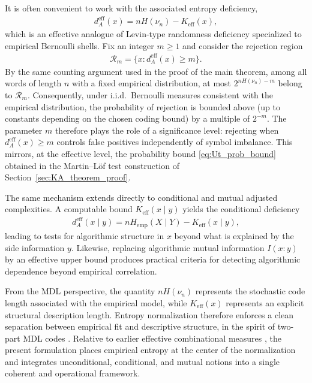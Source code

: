 \documentclass[12pt]{article}
\begin{document}
It is often convenient to work with the associated entropy deficiency,
\begin{eqnarray}
d_A^{\mathrm{eff}}(x)
=
nH(\nu_n)-K_{\mathrm{eff}}(x),
\label{eq:eff_deficiency_clean}
\end{eqnarray}
which is an effective analogue of Levin-type randomness deficiency specialized
to empirical Bernoulli shells. Fix an integer $m\ge1$ and consider the rejection
region
\begin{eqnarray}
\mathcal{R}_m
=
\{x:d_A^{\mathrm{eff}}(x)\ge m\}.
\label{eq:reject_region_clean}
\end{eqnarray}
By the same counting argument used in the proof of the main theorem, among all
words of length $n$ with a fixed empirical distribution, at most
$2^{nH(\nu_n)-m}$ belong to $\mathcal{R}_m$. Consequently, under i.i.d.\
Bernoulli measures consistent with the empirical distribution, the probability
of rejection is bounded above (up to constants depending on the chosen coding
bound) by a multiple of $2^{-m}$. The parameter $m$ therefore plays the role of a
significance level: rejecting when $d_A^{\mathrm{eff}}(x)\ge m$ controls false
positives independently of symbol imbalance. This mirrors, at the effective
level, the probability bound \eqref{eq:Ut_prob_bound} obtained in the
Martin--L\"of test construction of Section~\ref{sec:KA_theorem_proof}.

The same mechanism extends directly to conditional and mutual adjusted
complexities. A computable bound $K_{\mathrm{eff}}(x\mid y)$ yields the
conditional deficiency
\begin{eqnarray}
d_A^{\mathrm{eff}}(x\mid y)
=
nH_{\mathrm{emp}}(X\mid Y)-K_{\mathrm{eff}}(x\mid y),
\end{eqnarray}
leading to tests for algorithmic structure in $x$ beyond what is explained by
the side information $y$. Likewise, replacing algorithmic mutual information
$I(x:y)$ by an effective upper bound produces practical criteria for detecting
algorithmic dependence beyond empirical correlation.

From the MDL perspective, the quantity $nH(\nu_n)$ represents the stochastic
code length associated with the empirical model, while $K_{\mathrm{eff}}(x)$
represents an explicit structural description length. Entropy normalization
therefore enforces a clean separation between empirical fit and descriptive
structure, in the spirit of two-part MDL codes
\citep{BarronRissanenYu1998,Grunwald2007}. Relative to earlier effective
combinational measures \citep{StojanovicVidakovic1987}, the present formulation
places empirical entropy at the center of the normalization and integrates
unconditional, conditional, and mutual notions into a single coherent and
operational framework.
\end{document}
